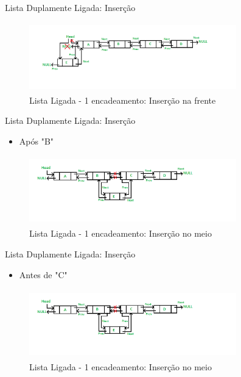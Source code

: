 \begin{frame}
	\begin{block}{Lista Duplamente Ligada: Inserção}
		\begin{figure}[!htb]
			\centering	  				
			\includegraphics[height=3cm, width = 9cm]{./pic/DLL_add_front1.png}
			\caption{Lista Ligada - 1 encadeamento: Inserção na frente}
			\label{fig_LDE_front}
		\end{figure}
	\end{block}
\end{frame}


\begin{frame}
	\begin{block}{Lista Duplamente Ligada: Inserção}
	\begin{itemize}
			\item Após "B"
	\end{itemize}
		\begin{figure}[!htb]
			\centering	  				
			\includegraphics[height=3cm, width = 9cm]{./pic/DLL_add_middle1.png}
			\caption{Lista Ligada - 1 encadeamento: Inserção no meio}
			\label{fig_LDE_midle1}
		\end{figure}
	\end{block}
\end{frame}


\begin{frame}
	\begin{block}{Lista Duplamente Ligada: Inserção}
	\begin{itemize}
			\item Antes de "C"
	\end{itemize}
		\begin{figure}[!htb]
			\centering	  				
			\includegraphics[height=3cm, width = 9cm]{./pic/DLL_add_middle1.png}
			\caption{Lista Ligada - 1 encadeamento: Inserção no meio}
			\label{fig_LDE_midle2}
		\end{figure}
	\end{block}
\end{frame}



